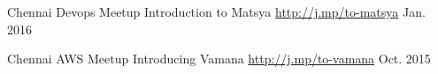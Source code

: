 

\begin{cventries}

  \cventry
    {Chennai Devops Meetup} %
    {Introduction to Matsya} %
    {\href{http://j.mp/to-matsya}{http://j.mp/to-matsya}} %
    {Jan. 2016} %
    {
    }

  \cventry
    {Chennai AWS Meetup} %
    {Introducing Vamana} %
    {\href{http://j.mp/to-vamana}{http://j.mp/to-vamana}} %
    {Oct. 2015} %
    {
    }

\end{cventries}
